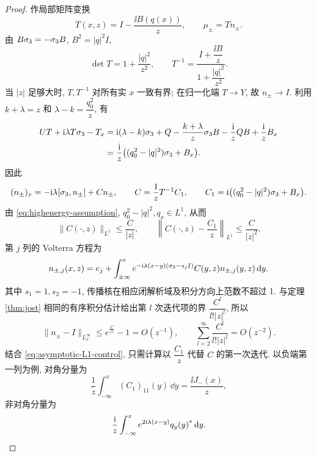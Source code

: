 \begin{proof}
作局部矩阵变换
\begin{equation*}
 T(x,z)=I-\dfrac{\ii B(q(x))}{z},\qquad \mu_\pm= T n_\pm.
\end{equation*}
由 $B\sigma_3=-\sigma_3 B$, $B^2=|q|^2I$,
\begin{equation*}
\det T=1+\dfrac{|q|^2}{z^2},\qquad
 T^{-1}=\dfrac{I+\dfrac{\ii B}{z}}{1+\dfrac{|q|^2}{z^2}}.
\end{equation*}
当 $|z|$ 足够大时, $ T, T^{-1}$ 对所有实 $x$ 一致有界; 在归一化端 $ T\to Y$, 故 $n_\pm\to I$. 利用 $k+\lambda=z$ 和 $\lambda-k=\dfrac{q_0^2}{z}$, 有
\begin{align*}
U T+\mathrm{i}\lambda T\sigma_3- T_x
&=\mathrm{i}(\lambda-k)\sigma_3+Q-\dfrac{k+\lambda}{z}\sigma_3 B
-\dfrac{\mathrm{i}}{z}QB+\dfrac{\mathrm{i}}{z}B_x\\
&=\dfrac{\mathrm{i}}{z}\bigl((q_0^2-|q|^2)\sigma_3+B_x\bigr).
\end{align*}
因此
\begin{equation}\label{eq:n-volterra-system}
(n_\pm)_x=-\mathrm{i}\lambda[\sigma_3,n_\pm]+ Cn_\pm,\qquad
 C=\dfrac{1}{z} T^{-1} C_1,\qquad
 C_1=\mathrm{i}\bigl((q_0^2-|q|^2)\sigma_3+B_x\bigr).
\end{equation}
由 \eqref{eq:highenergy-assumption}, $q_0^2-|q|^2,q_x\in L^1$, 从而
\begin{equation}\label{eq:asymptotic-L1-control}
\| C(\cdot,z)\|_{L^1}\le\dfrac{C}{|z|},\qquad
\left\| C(\cdot,z)-\dfrac{ C_1}{z}\right\|_{L^1}
\le\dfrac{C}{|z|^2}.
\end{equation}
第 $j$ 列的 Volterra 方程为
\begin{equation*}
n_{\pm,j}(x,z)=e_j+\int_{\pm\infty}^{x}
e^{-\mathrm{i}\lambda(x-y)(\sigma_3-s_jI)} C(y,z)n_{\pm,j}(y,z)\,\mathrm{d} y.
\end{equation*}
其中 $s_1=1,s_2=-1$, 传播核在相应闭解析域及积分方向上范数不超过 1. 与定理 \ref{thm:jost} 相同的有序积分估计给出第 $l$ 次迭代项的界 $\dfrac{C^l}{l!|z|^l}$, 所以
\begin{equation*}
\|n_\pm-I\|_{L^\infty_x}\le e^{\frac{C}{|z|}}-1=O(z^{-1}),\qquad
\sum\limits_{l=2}^{\infty}\dfrac{C^l}{l!|z|^l}=O(z^{-2}).
\end{equation*}
结合 \eqref{eq:asymptotic-L1-control}, 只需计算以 $\dfrac{ C_1}{z}$ 代替 $ C$ 的第一次迭代. 以负端第一列为例, 对角分量为
\begin{equation*}
\dfrac{1}{z}\int_{-\infty}^{x}( C_1)_{11}(y)\,\dd y
=\dfrac{\ii J_-(x)}{z},
\end{equation*}
非对角分量为
\begin{equation*}
\dfrac{\mathrm{i}}{z}\int_{-\infty}^{x}e^{2\mathrm{i}\lambda(x-y)}{q_y(y)}^{*}\,\mathrm{d} y.
\end{equation*}

\end{proof}
